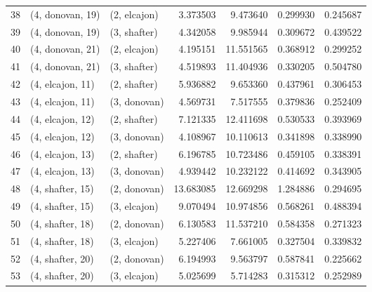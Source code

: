\begin{tabular}{lllrrrr}
38 &  (4, donovan, 19) &     (2, elcajon) &   3.373503 &   9.473640 &   0.299930 &  0.245687 \\
39 &  (4, donovan, 19) &     (3, shafter) &   4.342058 &   9.985944 &   0.309672 &  0.439522 \\
40 &  (4, donovan, 21) &     (2, elcajon) &   4.195151 &  11.551565 &   0.368912 &  0.299252 \\
41 &  (4, donovan, 21) &     (3, shafter) &   4.519893 &  11.404936 &   0.330205 &  0.504780 \\
42 &  (4, elcajon, 11) &     (2, shafter) &   5.936882 &   9.653360 &   0.437961 &  0.306453 \\
43 &  (4, elcajon, 11) &     (3, donovan) &   4.569731 &   7.517555 &   0.379836 &  0.252409 \\
44 &  (4, elcajon, 12) &     (2, shafter) &   7.121335 &  12.411698 &   0.530533 &  0.393969 \\
45 &  (4, elcajon, 12) &     (3, donovan) &   4.108967 &  10.110613 &   0.341898 &  0.338990 \\
46 &  (4, elcajon, 13) &     (2, shafter) &   6.196785 &  10.723486 &   0.459105 &  0.338391 \\
47 &  (4, elcajon, 13) &     (3, donovan) &   4.939442 &  10.232122 &   0.414692 &  0.343905 \\
48 &  (4, shafter, 15) &     (2, donovan) &  13.683085 &  12.669298 &   1.284886 &  0.294695 \\
49 &  (4, shafter, 15) &     (3, elcajon) &   9.070494 &  10.974856 &   0.568261 &  0.488394 \\
50 &  (4, shafter, 18) &     (2, donovan) &   6.130583 &  11.537210 &   0.584358 &  0.271323 \\
51 &  (4, shafter, 18) &     (3, elcajon) &   5.227406 &   7.661005 &   0.327504 &  0.339832 \\
52 &  (4, shafter, 20) &     (2, donovan) &   6.194993 &   9.563797 &   0.587841 &  0.225662 \\
53 &  (4, shafter, 20) &     (3, elcajon) &   5.025699 &   5.714283 &   0.315312 &  0.252989 \\
\bottomrule
\end{tabular}
